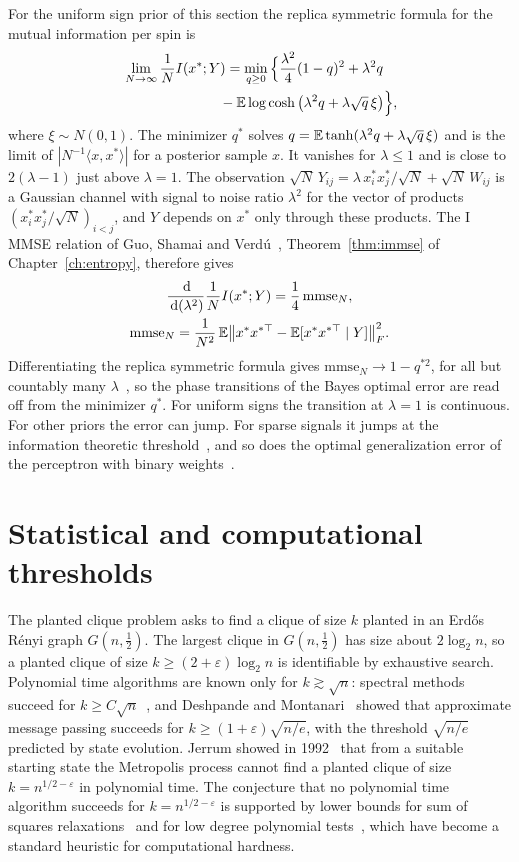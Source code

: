 For the uniform sign prior of this section the replica symmetric formula for the mutual information per spin is
\[
\begin{multlined}\lim_{N\to\infty}\frac1NI(x^*;Y) = \min_{q\geq0}\Big\{\frac{\lambda^2}{4}(1-q)^2+\lambda^2q\\ -\E\log\cosh\big(\lambda^2q+\lambda\sqrt q\,\xi\big)\Big\},\end{multlined}
\]
where $\xi\sim N(0,1)$. The minimizer $q^*$ solves $q = \mathbb{E}\tanh(\lambda^2q+\lambda\sqrt q\,\xi)$ and is the limit of $|N^{-1}\langle x,x^*\rangle|$ for a posterior sample $x$. It vanishes for $\lambda\leq1$ and is close to $2(\lambda-1)$ just above $\lambda = 1$. The observation $\sqrt N\,Y_{ij} = \lambda\,x^*_ix^*_j/\sqrt N+\sqrt N\,W_{ij}$ is a Gaussian channel with signal to noise ratio $\lambda^2$ for the vector of products $(x^*_ix^*_j/\sqrt N)_{i<j}$, and $Y$ depends on $x^*$ only through these products. The I MMSE relation of Guo, Shamai and Verd\'u~\cite{guo2005}, Theorem~\ref{thm:immse} of Chapter~\ref{ch:entropy}, therefore gives
\begin{gather*}
\frac{\,\mathrm{d}}{\,\mathrm{d}(\lambda^2)}\frac1NI(x^*;Y) = \frac14\,\mathrm{mmse}_N, \\
\mathrm{mmse}_N = \frac{1}{N^2}\,\mathbb{E}\big\|x^*x^{*\top}-\mathbb{E}[x^*x^{*\top}\mid Y]\big\|_F^2.
\end{gather*}
Differentiating the replica symmetric formula gives $\mathrm{mmse}_N\to1-q^{*2}$, for all but countably many $\lambda$~\cite{lelarge2019}, so the phase transitions of the Bayes optimal error are read off from the minimizer $q^*$. For uniform signs the transition at $\lambda = 1$ is continuous. For other priors the error can jump. For sparse signals it jumps at the information theoretic threshold~\cite{lesieur2017}, and so does the optimal generalization error of the perceptron with binary weights~\cite{barbier2019b}.

\section{Statistical and computational thresholds}

The planted clique problem asks to find a clique of size $k$ planted in an Erd\H{o}s R\'enyi graph $G(n,\frac12)$. The largest clique in $G(n,\frac12)$ has size about $2\log_2n$, so a planted clique of size $k\geq(2+\varepsilon)\log_2n$ is identifiable by exhaustive search. Polynomial time algorithms are known only for $k\gtrsim\sqrt n$: spectral methods succeed for $k\geq C\sqrt n$~\cite{alon1998}, and Deshpande and Montanari~\cite{deshpande2015} showed that approximate message passing succeeds for $k\geq(1+\varepsilon)\sqrt{n/e}$, with the threshold $\sqrt{n/e}$ predicted by state evolution. Jerrum showed in 1992~\cite{jerrum1992} that from a suitable starting state the Metropolis process cannot find a planted clique of size $k = n^{1/2-\varepsilon}$ in polynomial time. The conjecture that no polynomial time algorithm succeeds for $k = n^{1/2-\varepsilon}$ is supported by lower bounds for sum of squares relaxations~\cite{barak2019} and for low degree polynomial tests~\cite{kunisky2019}, which have become a standard heuristic for computational hardness.

